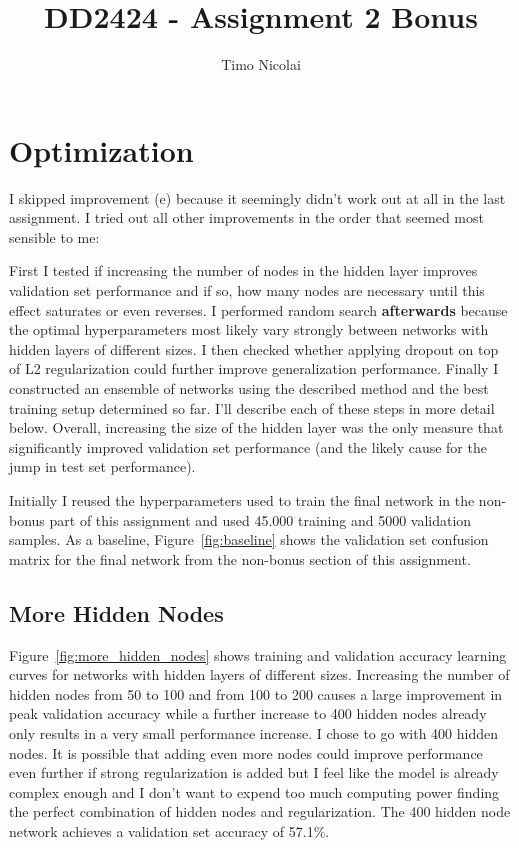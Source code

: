 \documentclass{article}
\begin{document}
\title{DD2424 - Assignment 2 Bonus}
\author{Timo Nicolai}

\maketitle

\section{Optimization}

I skipped improvement (e) because it seemingly didn't work out at all in the
last assignment. I tried out all other improvements in the order that seemed
most sensible to me:

First I tested if increasing the number of nodes in the hidden layer improves
validation set performance and if so, how many nodes are necessary until this
effect saturates or even reverses. I performed random search
\textbf{afterwards} because the optimal hyperparameters most likely vary
strongly between networks with hidden layers of different sizes. I then checked
whether applying dropout on top of L2 regularization could further improve
generalization performance. Finally I constructed an ensemble of networks
using the described method and the best training setup determined so far.
I'll describe each of these steps in more detail below. Overall, increasing
the size of the hidden layer was the only measure that significantly improved
validation set performance (and the likely cause for the jump in test set
performance).

Initially I reused the hyperparameters used to train the final network in the
non-bonus part of this assignment and used 45.000 training and 5000 validation
samples. As a baseline, Figure~\ref{fig:baseline} shows the validation set
confusion matrix for the final network from the non-bonus section of this
assignment.

\subsection{More Hidden Nodes}

Figure~\ref{fig:more_hidden_nodes} shows training and validation accuracy
learning curves for networks with hidden layers of different sizes. Increasing
the number of hidden nodes from 50 to 100 and from 100 to 200 causes
a large improvement in peak validation accuracy while a further increase to
400 hidden nodes already only results in a very small performance increase.
I chose to go with 400 hidden nodes. It is possible that adding even more nodes
could improve performance even further if strong regularization is added but
I feel like the model is already complex enough and I don't want to expend
too much computing power finding the perfect combination of hidden nodes and
regularization. The 400 hidden node network achieves a validation set accuracy
of 57.1\%.
\end{document}
